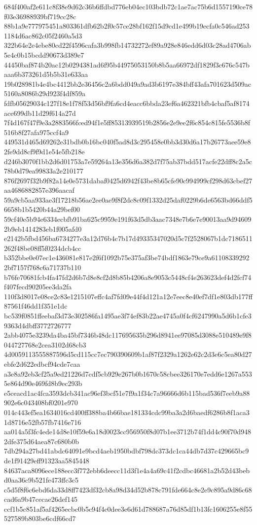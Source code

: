 {684f400af2e611c8f38e9d62c36b6ffdbd776eb04ec103bdb72c1ae7ac75b6d1557190ce78f03e36988939bf719cc28c
88b1a9e777975451a803361dfb62b2f0c57ce28bf162f15d9cd1e499b19ecfa0c546ad2531184d6ac862c05f2460a5d3
322b64e2e4ebe80cd22f4596cafa3b998fb14732272ef89a928e846edd6d03c28ad4706ab5e4c0b15bcdd90673d389e7
44450baf874b20ac12b0294381ad6f95b44975053150b8b5aa66972df1829f3c676c547baaa6b373261d5b5b31e633aa
19b028981b4e4bc4412bb2e36456c2a6bdd049a9ad3b6197e384bff43afa701623d509ac5160a8086b29d923f4df859a
fdfb05629034c127f18e1f78f53d56bf9fa6cd4eacc6bbda23ef6a462321bfb4cbaf5af8174ace699db11d29f614a27d
7f4d167f47f9e3a2883566fced94f1e5ff85313939519b2856e2e9ee2f6c854c815fe5536b8f516b8f27afa975ccf4a9
449531d465d69262e31bdb0b16bc040f5ad8d3c295458e0bb3d30d6a17b26773aee59e82fe9dd8cf9f9d1e54e5fb218e
d246b3070f1bb2d6d01753a7e59264a13e356d6a382d7f75ab37bdd517acfe22dff8c2a5c78b0d79ea99833a2e210177
876f2697f32b9f82a14e0e5731dabaf0425d6942f43be8b65cfe90c994999cf298d63cbef27aa4686882857e396aacaf
59a9cb5aa933ae3f17218b56ae2ee0ae9f8f2dc8c09f1332d25daf0229b6de6563bd66ddf56658b1b5420b44a29bef00
59cf40e5b94e6334ecbfb91ba625c9959e191f63d5db3aac7348e7b6e7e90013aa9d946092b9eb1414283eb1f005afd0
e2142b5fbd456ba6734277e3a12d76b4c7b17d49335347020d5c7f2528067b1dc7186511262f48be08ff5f0234dcb4cc
b352bbe0e07ec1e436081e817e2f6f1092b75e375af3be74bdf1863e79ce9a611083392922bf7157f768c6a71737b110
b76fe70681fcb4fa47fd2d6b7d8e8cf2d8b85b4206a8e9053c5448cf4e263623def4d2fcf74f407fecd90205ee3da2fa
110f3d8017e08ce2c83e1215107effc4af7fd09e44f4d121a12e7eec8e40ef7df1e803db177ff87561f46dd1f351e1dc
bc539f0851ffeebaf3d73e302586fa1495ae3f74ef83b22ae4745a0f4cf6247990a5d6b1cfe39363d4dbff3772726777
2abb4075e3239da4ba45bf7346b48dc117695635b296d8941ee97085d3088e510489e9f8044727768e2cea3102d68cb3
4d0059113555887596d5cd115cc7ec790390609b1af87f2329a1262e62c2d3e6c5ea80d27ebfe2d622edbcf94cde7caa
a3e8a92eb3cf25a9ed21226d7cdf5cb929e267b0b1670c58cbee326170e7edd6e1267a5535e864d90e469fd8b9ec293b
e5ceacd1ac4fca3593dcb341ac96ef3bcf51e7f9a1f34c7a96666d6b115bad536f7eeb9a88902e6c043408bf0201e970
014c443ef5ea1634016cd400ff388ba4b66bae181334cdc99ba3a2d6baedf6286b8f1aca31d8716e52fb57fb7416e716
aa014a5f3fc4ede14d8e10f59e6a18d0023cc956950f8d07b1ee3712b74f1dd4c90f70d9482dfe375d64aea87c680b0b
7db294a27bd41abdc64091e9bcd4aeb1950bdbf798dc373dc1ca44db7d37c429665bc9de1f91429eff91323aa5845448
84637aca8096ece188ecc3f772ebb6deecc11d3f1e4a4a69c41f2cdbc46681a2b52d43bebd0aa36c9b521fe473ffc3c5
c5d5f8f6c6ebd6da33d8ff7423df32cb8a98d34d52b878c791fde664c8e2e9c895a9d86c68cad6a9b47cecae26def145
ccf1b5c851af5af4265ecbc0b5c94f4c0dee3e6d61d788687a76d85df1b13fc1606255e8f55527589b803be6cdf66cd7
}
